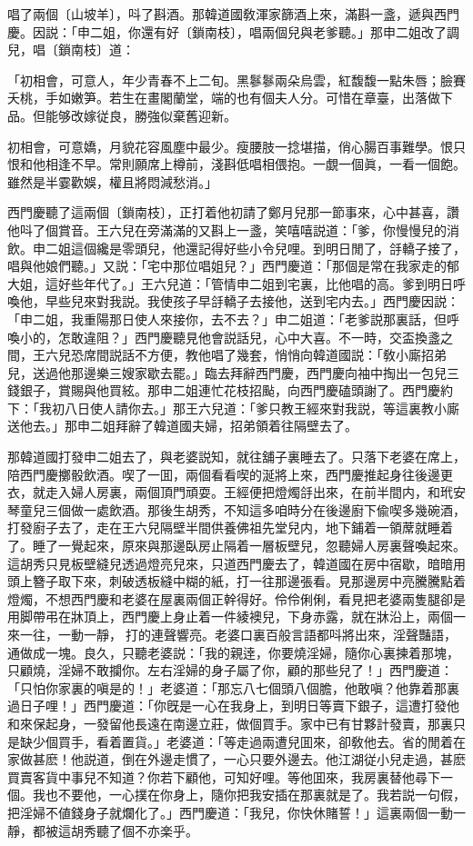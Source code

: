 唱了兩個〔山坡羊〕，呌了斟酒。那韓道國敎渾家篩酒上來，滿斟一盞，遞與西門慶。因説：「申二姐，你還有好〔鎖南枝〕，唱兩個兒與老爹聽。」那申二姐改了調兒，唱〔鎖南枝〕道：

\begin{myquote}
「初相會，可意人，年少青春不上二旬。黑鬖鬖兩朵烏雲，紅馥馥一點朱唇；臉賽夭桃，手如嫩笋。若生在畫閣蘭堂，端的也有個夫人分。可惜在章臺，出落做下品。但能够改嫁従良，勝強似棄舊迎新。

初相會，可意嬌，月貌花容風塵中最少。瘦腰肢一捻堪描，俏心腸百事難學。恨只恨和他相逢不早。常則願席上樽前，淺斟低唱相偎抱。一覷一個眞，一看一個飽。雖然是半霎歡娛，權且將悶減愁消。」
\end{myquote}

西門慶聽了這兩個〔鎖南枝〕，正打着他初請了鄭月兒那一節事來，心中甚喜，讚他呌了個賞音。王六兒在旁滿滿的又斟上一盞，笑嘻嘻説道：「爹，你慢慢兒的消飲。申二姐這個纔是零頭兒，他還記得好些小令兒哩。到明日閒了，㧱轎子接了，唱與他娘們聽。」又説：「宅中那位唱姐兒？」西門慶道：「那個是常在我家走的郁大姐，這好些年代了。」王六兒道：「管情申二姐到宅裏，比他唱的高。爹到明日呼喚他，早些兒來對我説。我使孩子早㧱轎子去接他，送到宅内去。」西門慶因説：「申二姐，我重陽那日使人來接你，去不去？」申二姐道：「老爹説那裏話，但呼喚小的，怎敢違阻？」西門慶聽見他會説話兒，心中大喜。不一時，交盃換盞之間，王六兒恐席間説話不方便，教他唱了幾套，悄悄向韓道國説：「敎小廝招弟兒，送過他那邊樂三嫂家歇去罷。」臨去拜辭西門慶，西門慶向袖中掏出一包兒三錢銀子，賞賜與他買絃。那申二姐連忙花枝招颭，向西門慶磕頭謝了。西門慶約下：「我初八日使人請你去。」那王六兒道：「爹只教王經來對我説，等這裏教小廝送他去。」那申二姐拜辭了韓道國夫婦，招弟領着往隔壁去了。

那韓道國打發申二姐去了，與老婆説知，就往舖子裏睡去了。只落下老婆在席上，陪西門慶擲骰飲酒。喫了一囬，兩個看看喫的涎將上來，西門慶推起身往後邊更衣，就走入婦人房裏，兩個頂門頑耍。王經便把燈燭㧱出來，在前半間内，和玳安琴童兒三個做一處飲酒。那後生胡秀，不知這多咱時分在後邊廚下偸喫多幾碗酒，打發廚子去了，走在王六兒隔壁半間供養佛祖先堂兒内，地下鋪着一領蓆就睡着了。睡了一覺起來，原來與那邊臥房止隔着一層板壁兒，忽聽婦人房裏聲喚起來。這胡秀只見板壁縫兒透過燈亮兒來，只道西門慶去了，韓道國在房中宿歇，暗暗用頭上簪子取下來，刺破透板縫中糊的紙，打一往那邊張看。見那邊房中亮騰騰點着燈燭，不想西門慶和老婆在屋裏兩個正幹得好。伶伶俐俐，看見把老婆兩隻腿卻是用脚帶弔在牀頂上，西門慶上身止着一件綾襖兒，下身赤露，就在牀沿上，兩個一來一往，一動一靜，𢵞打的連聲響亮。老婆口裏百般言語都呌將出來，淫聲豔語，通做成一塊。良久，只聽老婆説：「我的親逹，你要燒淫婦，隨你心裏揀着那塊，只顧燒，淫婦不敢攔你。左右淫婦的身子屬了你，顧的那些兒了！」西門慶道：「只怕你家裏的嗔是的！」老婆道：「那忘八七個頭八個膽，他敢嗔？他靠着那裏過日子哩！」西門慶道：「你旣是一心在我身上，到明日等賣下銀子，這遭打發他和來保起身，一發留他長遠在南邊立莊，做個買手。家中已有甘夥計發賣，那裏只是缺少個買手，看着置貨。」老婆道：「等走過兩遭兒囬來，卻敎他去。省的閒着在家做甚麽！他説道，倒在外邊走慣了，一心只要外邊去。他江湖従小兒走過，甚麽買賣客貨中事兒不知道？你若下顧他，可知好哩。等他囬來，我房裏替他尋下一個。我也不要他，一心撲在你身上，隨你把我安插在那裏就是了。我若説一句假，把淫婦不値錢身子就爛化了。」西門慶道：「我兒，你快休賭誓！」這裏兩個一動一靜，都被這胡秀聽了個不亦楽乎。

